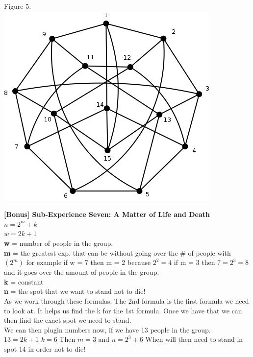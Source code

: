 \documentclass[10pt,a4paper]{report}
\begin{document}
		\begin{center}
			Figure 5.\\
			\includegraphics[scale=.5]{e6.png}
			\newline
			\newline
		\end{center}
	\textbf{[Bonus] Sub-Experience Seven: A Matter of Life and Death}\\	
		$n = 2^m + k$\\
		$w = 2k + 1$\\
		\textbf{w} = number of people in the group.\\
		\textbf{m} = the greatest exp. that can be without going over the \# of people with $(2^m)$ for example if w = 7 then m = 2 because $2^2 = 4$ if m = 3 then $7 = 2^3 = 8$ and it goes over the amount of people in the group.\\
		\textbf{k} = constant\\
		\textbf{n} = the spot that we want to stand not to die!\\
		\newline
		As we work through these formulas.  The 2nd formula is the first formula we need to look at.  It helps us find the k for the 1st formula.  Once we have that we can then find the exact spot we need to stand.\\
		\newline
		We can then plugin numbers now, if we have 13 people in the group.\\
		$13 = 2k + 1$ $k = 6$  Then $m = 3$ and $n = 2^3 + 6$ When will then need to stand in spot 14 in order not to die!
		\begin{center}

		\end{center}
\end{document}
